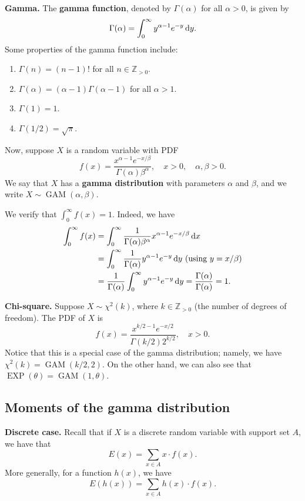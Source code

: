 \documentclass[10pt]{article}
\newcommand{\Z}{\mathbb{Z}}
\DeclareMathOperator{\EXP}{EXP}
\DeclareMathOperator{\GAM}{GAM}
\theoremstyle{newstyle}
\begin{document}
{\bf Gamma.} The {\bf gamma function}, denoted by $\Gamma(\alpha)$ for all $\alpha > 0$, is given by 
\[ \Gamma(\alpha) = \int_0^\infty y^{\alpha-1} e^{-y}\,{\rm d}y. \]
Some properties of the gamma function include:
\begin{enumerate}[(1)]
    \item $\Gamma(n) = (n-1)!$ for all $n \in \Z_{>0}$. 
    \item $\Gamma(\alpha) = (\alpha - 1) \Gamma(\alpha - 1)$ for all $\alpha > 1$. 
    \item $\Gamma(1) = 1$.
    \item $\Gamma(1/2) = \sqrt{\pi}$.
\end{enumerate}
Now, suppose $X$ is a random variable with PDF 
\[ f(x) = \frac{x^{\alpha-1} e^{-x/\beta}}{\Gamma(\alpha) \beta^\alpha}, \quad x > 0, \quad 
\alpha, \beta > 0. \]
We say that $X$ has a {\bf gamma distribution} with parameters $\alpha$ and $\beta$, and we 
write $X \sim \GAM(\alpha, \beta)$. 

\newpage
We verify that $\int_0^\infty f(x) = 1$. Indeed, we have 
\begin{align*}
    \int_0^\infty f(x) 
    &= \int_0^\infty \frac{1}{\Gamma(\alpha) \beta^\alpha} x^{\alpha-1} e^{-x/\beta} \, {\rm d}x \\
    &= \int_0^\infty \frac{1}{\Gamma(\alpha)} y^{\alpha-1} e^{-y} \, {\rm d}y \text{ (using $y = x/\beta$)} \\
    &= \frac{1}{\Gamma(\alpha)} \int_0^\infty y^{\alpha-1} e^{-y} \, {\rm d}y 
    = \frac{\Gamma(\alpha)}{\Gamma(\alpha)} = 1.
\end{align*}

{\bf Chi-square.} Suppose $X \sim \chi^2(k)$, where $k \in \Z_{>0}$ (the number of degrees of 
freedom). The PDF of $X$ is 
\[ f(x) = \frac{x^{k/2-1} e^{-x/2}}{\Gamma(k/2) 2^{k/2}}, \quad x > 0. \]
Notice that this is a special case of the gamma distribution; namely, 
we have $\chi^2(k) = \GAM(k/2, 2)$.
On the other hand, we can also see that $\EXP(\theta) = \GAM(1, \theta)$. 

\subsection{Moments of the gamma distribution}

{\bf Discrete case.} Recall that if $X$ is a discrete random variable with support set $A$, we have that 
\[ E(x) = \sum_{x \in A} x \cdot f(x). \]
More generally, for a function $h(x)$, we have 
\[ E(h(x)) = \sum_{x \in A} h(x) \cdot f(x). \]
\end{document}
